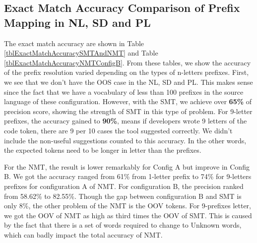 \subsection{Exact Match Accuracy Comparison of Prefix Mapping in NL, SD and PL}
The exact match accuracy are shown in Table \ref{tblExactMatchAccuracySMTAndNMT} and Table \ref{tblExactMatchAccuracyNMTConfigB}. From these tables, we show the accuracy of the prefix resolution varied depending on the types of n-letters prefixes. First, we see that we don't have the OOS case in the NL, SD and PL. This makes sense since the fact that we have a vocabulary of less than 100 prefixes in the source language of these configuration. However, with the SMT, we achieve over \textbf{65\%} of precision score, showing the strength of SMT in this type of problem. For 9-letter prefixes, the accuracy gained to \textbf{90\%}, means if developers wrote 9 letters of the code token, there are 9 per 10 cases the tool suggested correctly. We didn't include the non-useful suggestions counted to this accuracy. In the other words, the expected tokens need to be longer in letter than the prefixes.

For the NMT, the result is lower remarkably for Config A but improve in Config B. We got the accuracy ranged from 61\% from 1-letter prefix to 74\% for 9-letters prefixes for configuration A of NMT. For configuration B, the precision ranked from 58.62\% to 82.55\%. Though the gap between configuration B and SMT is only 8\%, the other problem of the NMT is the OOV tokens. For 9-prefixes letter, we got the OOV of NMT as high as third times the OOV of SMT. This is caused by the fact that there is a set of words required to change to Unknown words, which can badly impact the total accuracy of NMT.


